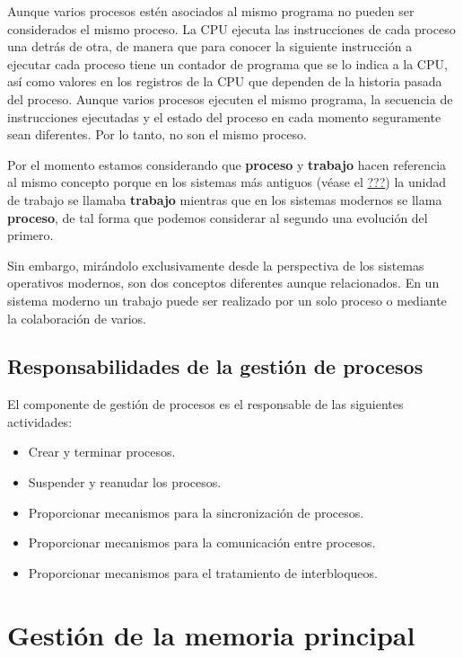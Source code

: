 Aunque varios procesos estén asociados al mismo programa no pueden ser
considerados el mismo proceso. La CPU ejecuta las instrucciones de cada
proceso una detrás de otra, de manera que para conocer la siguiente
instrucción a ejecutar cada proceso tiene un contador de programa que se
lo indica a la CPU, así como valores en los registros de la CPU que
dependen de la historia pasada del proceso. Aunque varios procesos
ejecuten el mismo programa, la secuencia de instrucciones ejecutadas y
el estado del proceso en cada momento seguramente sean diferentes. Por
lo tanto, no son el mismo proceso.

Por el momento estamos considerando que \textbf{proceso} y
\textbf{trabajo} hacen referencia al mismo concepto porque en los
sistemas más antiguos (véase el \hyperref[_mainframe]{???}) la unidad de
trabajo se llamaba \textbf{trabajo} mientras que en los sistemas
modernos se llama \textbf{proceso}, de tal forma que podemos considerar
al segundo una evolución del primero.

Sin embargo, mirándolo exclusivamente desde la perspectiva de los
sistemas operativos modernos, son dos conceptos diferentes aunque
relacionados. En un sistema moderno un trabajo puede ser realizado por
un solo proceso o mediante la colaboración de varios.

\subsection{Responsabilidades de la gestión de
procesos}\label{_responsabilidades_de_la_gestiuxf3n_de_procesos}

El componente de gestión de procesos es el responsable de las siguientes
actividades:

\begin{itemize}
\item
  Crear y terminar procesos.
\item
  Suspender y reanudar los procesos.
\item
  Proporcionar mecanismos para la sincronización de procesos.
\item
  Proporcionar mecanismos para la comunicación entre procesos.
\item
  Proporcionar mecanismos para el tratamiento de interbloqueos.
\end{itemize}

\section{Gestión de la memoria
principal}\label{_gestiuxf3n_de_la_memoria_principal}

